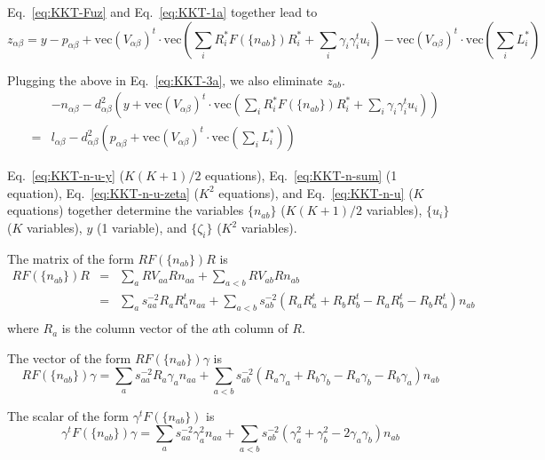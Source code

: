 \documentclass{article}
\newcommand*{\mvec}{\mathbf{\mathrm{vec}}}
\begin{document}
Eq.~\ref{eq:KKT-Fuz} and Eq.~\ref{eq:KKT-1a} together lead to
\begin{equation}
z_{\alpha\beta} = y - p_{\alpha\beta} + \mvec( V_{\alpha\beta})^t\cdot \mvec\left(\sum_i R_i^\ast F(\{ n_{ab}\}) R_i^\ast + \sum_i \gamma_i \gamma_i^t u_i\right) - \mvec(V_{\alpha\beta})^t\cdot \mvec\left(\sum_i L_i^\ast\right)
\end{equation}

Plugging the above in Eq.~\ref{eq:KKT-3a}, we also eliminate $z_{ab}$.
\begin{eqnarray}
&&-n_{\alpha\beta} - d_{\alpha\beta}^2 \left( y + \mvec(V_{\alpha\beta})^t\cdot
\mvec\left(\sum_i R_i^\ast F(\{ n_{ab} \}) R_i^\ast + \sum_i \gamma_i \gamma_i^t u_i\right)\right)
\nonumber \\
&=& l_{\alpha\beta} - d_{\alpha\beta}^2 \left(p_{\alpha\beta} + \mvec( V_{\alpha\beta})^t\cdot
\mvec\left( \sum_i L_i^\ast \right)\right)
\label{eq:KKT-n-u-y}
\end{eqnarray}

Eq.~\ref{eq:KKT-n-u-y} ($K(K+1)/2$ equations), Eq.~\ref{eq:KKT-n-sum}
(1 equation), Eq.~\ref{eq:KKT-n-u-zeta} ($K^2$ equations), and
Eq.~\ref{eq:KKT-n-u} ($K$ equations) together determine the
variables $\{ n_{ab} \}$ ($K(K+1)/2$ variables), $\{ u_i \}$ ($K$
variables), $y$ (1 variable), and $\{ \zeta_i \}$ ($K^2$ variables).

The matrix of the form $ R F(\{ n_{ab} \}) R$ is
\begin{eqnarray}
R F( \{ n_{ab} \}) R &=& \sum_a R V_{aa} R n_{aa} + \sum_{a<b} R V_{ab} R n_{ab}
\nonumber \\
&=& \sum_a s_{aa}^{-2} R_a R_a^t n_{aa} 
 + \sum_{a<b} s_{ab}^{-2} (R_a R_a^t + R_b R_b^t - R_a R_b^t - R_b R_a^t) n_{ab}
\nonumber \\
\end{eqnarray}
where $R_a$ is the column vector of the $a$th column of $R$.

The vector of the form $ R F(\{ n_{ab} \}) \gamma $ is
\begin{equation}
R F( \{ n_{ab} \}) \gamma = \sum_a s_{aa}^{-2} R_a \gamma_a n_{aa}
  + \sum_{a<b} s_{ab}^{-2} ( R_a \gamma_a + R_b \gamma_b - R_a \gamma_b - R_b \gamma_a) n_{ab}
\end{equation}

The scalar of the form $\gamma^t F(\{ n_{ab} \})$ is
\begin{equation}
\gamma^t F(\{ n_{ab} \}) \gamma = \sum_a s_{aa}^{-2} \gamma_a^2 n_{aa}
 + \sum_{a<b} s_{ab}^{-2} ( \gamma_a^2 + \gamma_b^2 - 2\gamma_a\gamma_b ) n_{ab}
\end{equation}
\end{document}
